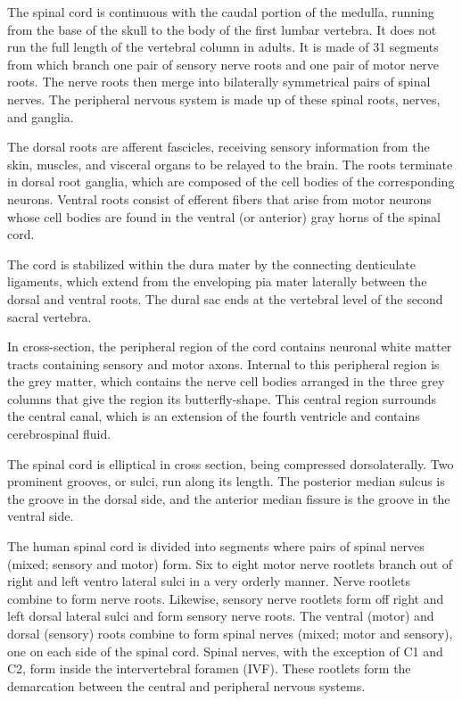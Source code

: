 The spinal cord is continuous with the caudal portion of the medulla, running from the base of the skull to the body of the first lumbar vertebra. It does not run the full length of the vertebral column in adults. It is made of 31 segments from which branch one pair of sensory nerve roots and one pair of motor nerve roots. The nerve roots then merge into bilaterally symmetrical pairs of spinal nerves. The peripheral nervous system is made up of these spinal roots, nerves, and ganglia.

The dorsal roots are afferent fascicles, receiving sensory information from the skin, muscles, and visceral organs to be relayed to the brain. The roots terminate in dorsal root ganglia, which are composed of the cell bodies of the corresponding neurons. Ventral roots consist of efferent fibers that arise from motor neurons whose cell bodies are found in the ventral (or anterior) gray horns of the spinal cord.

The cord is stabilized within the dura mater by the connecting denticulate ligaments, which extend from the enveloping pia mater laterally between the dorsal and ventral roots. The dural sac ends at the vertebral level of the second sacral vertebra.

In cross-section, the peripheral region of the cord contains neuronal white matter tracts containing sensory and motor axons. Internal to this peripheral region is the grey matter, which contains the nerve cell bodies arranged in the three grey columns that give the region its butterfly-shape. This central region surrounds the central canal, which is an extension of the fourth ventricle and contains cerebrospinal fluid.

The spinal cord is elliptical in cross section, being compressed dorsolaterally. Two prominent grooves, or sulci, run along its length. The posterior median sulcus is the groove in the dorsal side, and the anterior median fissure is the groove in the ventral side.

The human spinal cord is divided into segments where pairs of spinal nerves (mixed; sensory and motor) form. Six to eight motor nerve rootlets branch out of right and left ventro lateral sulci in a very orderly manner. Nerve rootlets combine to form nerve roots. Likewise, sensory nerve rootlets form off right and left dorsal lateral sulci and form sensory nerve roots. The ventral (motor) and dorsal (sensory) roots combine to form spinal nerves (mixed; motor and sensory), one on each side of the spinal cord. Spinal nerves, with the exception of C1 and C2, form inside the intervertebral foramen (IVF). These rootlets form the demarcation between the central and peripheral nervous systems.

